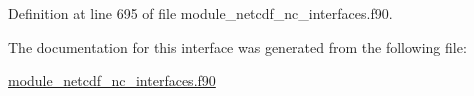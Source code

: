 Definition at line 695 of file module\+\_\+netcdf\+\_\+nc\+\_\+interfaces.\+f90.



The documentation for this interface was generated from the following file\+:\begin{DoxyCompactItemize}
\item 
\hyperlink{module__netcdf__nc__interfaces_8f90}{module\+\_\+netcdf\+\_\+nc\+\_\+interfaces.\+f90}\end{DoxyCompactItemize}
